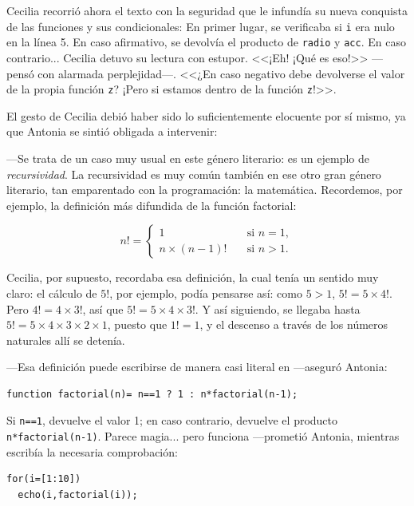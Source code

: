 Cecilia recorrió ahora el texto con la seguridad que le infundía su
nueva conquista de las funciones y sus condicionales: En primer lugar,
se verificaba si \lstinline!i! era nulo en la línea 5. En caso
afirmativo, se devolvía el producto de \lstinline!radio! y
\lstinline!acc!. En caso contrario... Cecilia detuvo su lectura con
estupor. <<¡Eh!  ¡Qué es eso!>> ---pensó con alarmada
perplejidad---. <<¿En caso negativo debe devolverse el valor de la
propia función \lstinline!z!? ¡Pero si estamos dentro de la función
\lstinline!z!!>>.

El gesto de Cecilia debió haber sido lo suficientemente elocuente por
sí mismo, ya que Antonia se sintió obligada a intervenir:

---Se trata de un caso muy usual en este género literario: es un
ejemplo de \emph{recursividad}. La recursividad es muy común también
en ese otro gran género literario, tan emparentado con la
programación: la matemática. Recordemos, por ejemplo, la definición
más difundida de la función factorial:

\begin{equation*}
  n! = 
  \begin{cases}
      1 &\quad \text{si } n=1,\\
      n\times(n-1)!&\quad \text{si } n>1.
  \end{cases}
\end{equation*}


Cecilia, por supuesto, recordaba esa definición, la cual tenía un
sentido muy claro: el cálculo de $5!$, por ejemplo, podía pensarse
así: como $5>1$, $5!=5\times4!$. Pero $4!=4\times3!$, así que
$5!=5\times4\times3!$. Y así siguiendo, se llegaba hasta
$5!=5\times4\times3\times2\times1$, puesto que $1!=1$, y el descenso a
través de los números naturales allí se detenía.

---Esa definición puede escribirse de manera casi literal en
\openscad{} ---aseguró Antonia:

\begin{lstlisting}[numbers=none]
function factorial(n)= n==1 ? 1 : n*factorial(n-1);
\end{lstlisting}

\guillemotright Si \lstinline!n==1!, devuelve el valor 1; en caso
contrario, devuelve el producto \lstinline!n*factorial(n-1)!.  Parece
magia... pero funciona ---prometió Antonia, mientras escribía la
necesaria comprobación:

\begin{lstlisting}
for(i=[1:10])
  echo(i,factorial(i));
\end{lstlisting}

